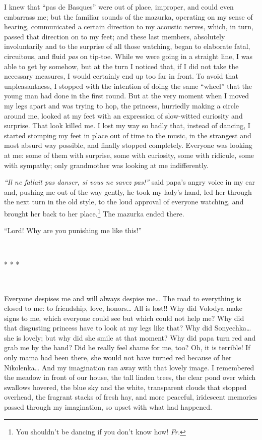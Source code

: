 I knew that ``pas de Basques'' were out of place, improper, and could even embarrass me; but the familiar sounds of the mazurka, operating on my sense of hearing, communicated a certain direction to my acoustic nerves, which, in turn, passed that direction on to my feet; and these last members, absolutely involuntarily and to the surprise of all those watching, began to elaborate fatal, circuitous, and fluid \textit{pas} on tip-toe. While we were going in a straight line, I was able to get by somehow, but at the turn I noticed that, if I did not take the necessary measures, I would certainly end up too far in front. To avoid that unpleasantness, I stopped with the intention of doing the same ``wheel'' that the young man had done in the first round. But at the very moment when I moved my legs apart and was trying to hop, the princess, hurriedly making a circle around me, looked at my feet with an expression of slow-witted curiosity and surprise. That look killed me. I lost my way so badly that, instead of dancing, I started stomping my feet in place out of time to the music, in the strangest and most absurd way possible, and finally stopped completely. Everyone was looking at me: some of them with surprise, some with curiosity, some with ridicule, some with sympathy; only grandmother was looking at me indifferently.

\textit{``Il ne fallait pas danser, si vous ne savez pas!''} said papa's angry voice in my ear and, pushing me out of the way gently, he took my lady's hand, led her through the next turn in the old style, to the loud approval of everyone watching, and brought her back to her place.\footnote{You shouldn't be dancing if you don't know how! \textit{Fr.}} The mazurka ended there. %

``Lord! Why are you punishing me like this!'' %

~

\centerline{* * *}

~

Everyone despises me and will always despise me\ldots{} The road to everything is closed to me: to friendship, love, honors\ldots{} All is lost!! Why did Volodya make signs to me, which everyone could see but which could not help me? Why did that disgusting princess have to look at my legs like that? Why did Sonyechka\ldots{}she is lovely; but why did she smile at that moment? Why did papa turn red and grab me by the hand? Did he really feel shame for me, too? Oh, it is terrible! If only mama had been there, she would not have turned red because of her Nikolenka\ldots{} And my imagination ran away with that lovely image. I remembered the meadow in front of our house, the tall linden trees, the clear pond over which swallows hovered, the blue sky and the white, transparent clouds that stopped overhead, the fragrant stacks of fresh hay, and more peaceful, iridescent memories passed through my imagination, so upset with what had happened.

